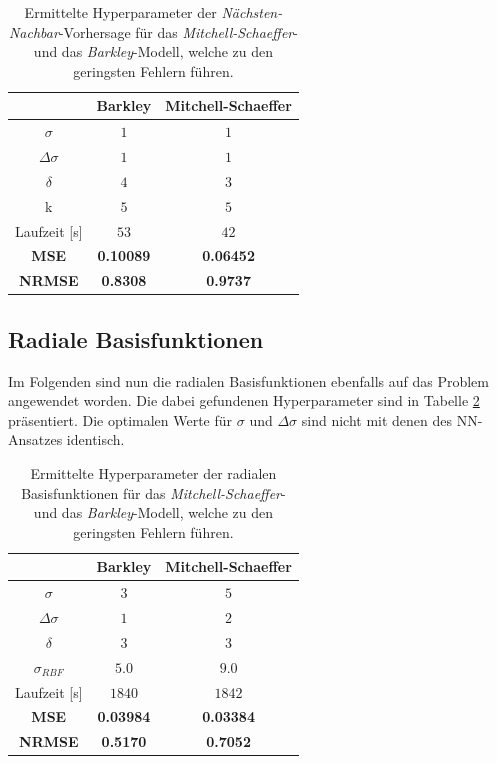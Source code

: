 \begin{table}[h]
	\centering

	\begin{tabular}{ccc}
		\hline		
		\multicolumn{1}{c}{} & Barkley & Mitchell-Schaeffer \\ 
		\hline 
		\rule[-1ex]{0pt}{2.5ex} $\sigma$ & $1$ & $1$ \\ 
		\rule[-1ex]{0pt}{2.5ex} $\Delta \sigma$ & $1$ & $1$ \\ 
		\rule[-1ex]{0pt}{2.5ex} $\delta$ & $4$ & $3$ \\ 
		\rule[-1ex]{0pt}{2.5ex} k & $5$ & $5$ \\ 
		\rule[-1ex]{0pt}{2.5ex} Laufzeit [s] & $53$ & $42$ \\ 
		\rule[-1ex]{0pt}{2.5ex} \textbf{MSE} & \textbf{0.10089} & \textbf{0.06452} \\ 
		\rule[-1ex]{0pt}{2.5ex} \textbf{NRMSE} & \textbf{0.8308} & \textbf{0.9737} \\ 
		\hline 
	\end{tabular} 

	\caption{Ermittelte Hyperparameter der \textit{Nächsten-Nachbar}-Vorhersage für das \textit{Mitchell-Schaeffer}- und das \textit{Barkley}-Modell, welche zu den geringsten Fehlern führen.}
\label{tab:exp_unblur_nn_results}
\end{table} 


\FloatBarrier
\subsection{Radiale Basisfunktionen}
Im Folgenden sind nun die radialen Basisfunktionen ebenfalls auf das Problem angewendet worden. Die dabei gefundenen Hyperparameter sind in Tabelle \ref{tab:exp_unblur_rbf_results} präsentiert. Die optimalen Werte für $\sigma$ und $\Delta \sigma$ sind nicht mit denen des \textsc{NN}-Ansatzes identisch.

\begin{table}[h]
	\centering

	\begin{tabular}{ccc}
		\hline
		\multicolumn{1}{c}{} & Barkley & Mitchell-Schaeffer \\ 
		\hline 
		\rule[-1ex]{0pt}{2.5ex} $\sigma$ & $3$ & $5$ \\ 
		\rule[-1ex]{0pt}{2.5ex} $\Delta \sigma$ & $1$ & $2$ \\ 
		\rule[-1ex]{0pt}{2.5ex} $\delta$ & $3$ & $3$ \\ 
		\rule[-1ex]{0pt}{2.5ex} $\sigma_{RBF}$ & $5.0$ & $9.0$ \\ 
		\rule[-1ex]{0pt}{2.5ex} Laufzeit [s] & $1840$ & $1842$ \\ 
		\rule[-1ex]{0pt}{2.5ex} \textbf{MSE} & \textbf{0.03984} & \textbf{0.03384} \\ 
		\rule[-1ex]{0pt}{2.5ex} \textbf{NRMSE} & \textbf{0.5170} & \textbf{0.7052} \\ 
		\hline 
	\end{tabular} 
	\caption{Ermittelte Hyperparameter der radialen Basisfunktionen für das \textit{Mitchell-Schaeffer}- und das \textit{Barkley}-Modell, welche zu den geringsten Fehlern führen.}
	\label{tab:exp_unblur_rbf_results}
\end{table} 


